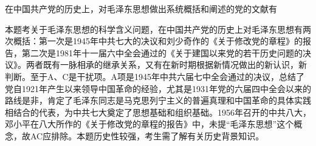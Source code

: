 \question 在中国共产党的历史上，对毛泽东思想做出系统概括和阐述的党的文献有
\par{}
\begin{solution}本题考关于毛泽东思想的科学含义问题，在中国共产党的历史上对毛泽东思想有两次概括：第一次是1945年中共七大的决议和刘少奇作的《关于修改党的章程》的报告，第二次是1981年十一届六中全会通过的《关于建国以来党的若干历史问题的决议》。两者既有一脉相承的继承关系，又有在新时期根据新情况做出的新认识，新判断。至于A、C是干扰项。A项是1945年中共六届七中全会通过的决议，总结了党自1921年产生以来领导中国革命的经验，尤其是1931年党的六届四中全会以来的路线是非，肯定了毛泽东同志是马克思列宁主义的普遍真理和中国革命的具体实践相结合的代表，为中共七大奠定了思想基础和组织基础。1956年召开的中共八大，邓小平在八大所作的《关于修改党的章程的报告》中，未提``毛泽东思想''这个概念，故AC应排除。本题历史性较强，考生需了解有关历史背景知识。
\end{solution}
